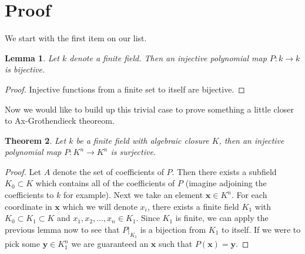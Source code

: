 \documentclass[a4paper]{article}
\newtheorem{theorem}{Theorem}[section]
\newtheorem{lemma}[theorem]{Lemma}
\begin{document}
\section{Proof}
We start with the first item on our list.
\begin{lemma}
Let $k$ denote a finite field. Then an injective polynomial map $P: k \to k$ is bijective.
\end{lemma}
\begin{proof}
Injective functions from a finite set to itself are bijective.
\end{proof}
Now we would like to build up this trivial case to prove something a little closer to Ax-Grothendieck theoreom.
\begin{theorem}
	Let $k$ be a finite field with algebraic closure $K$, then an injective polynomial map $P: K^{n} \to K^{n}$ is surjective.
\end{theorem}
\begin{proof}
	Let $A$ denote the set of coefficients of $P$. Then there exists a subfield $K_{0} \subset K$ which contains all of the coefficients of $P$ (imagine adjoining the coefficients to $k$ for example). Next we take an element $\mathbf{x} \in K^{n}$. For each coordinate in $\mathbf{x}$ which we will denote $x_{i}$, there exists a finite field $K_{1}$ with $K_{0} \subset K_{1} \subset K$ and $x_1, x_2, ..., x_n \in K_{1}$. Since $K_{1}$ is finite, we can apply the previous lemma now to see that $P|_{K_{1}}$ is a bijection from $K_{1}$ to itself. If we were to pick some $\mathbf{y} \in K_{1}^{n}$ we are guaranteed an $\mathbf{x}$ such that $P(\mathbf{x}) = \mathbf{y}$.
\end{proof}
\end{document}
